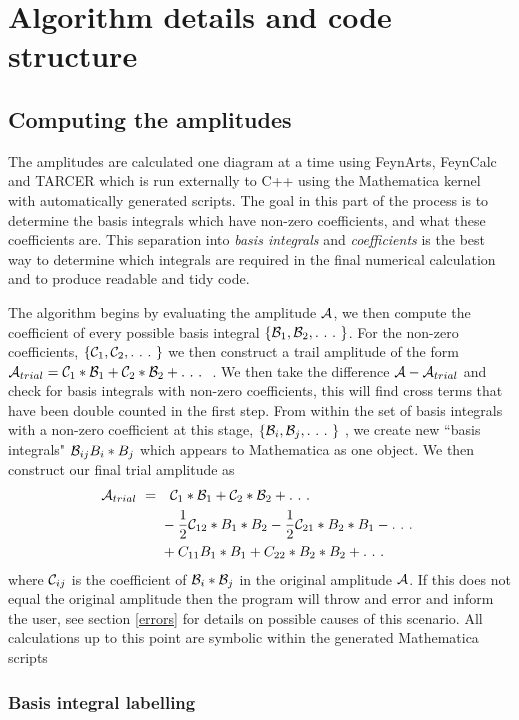 \section{Algorithm details and code structure}


\subsection{Computing the amplitudes}

The amplitudes are calculated one diagram at a time using FeynArts, FeynCalc and TARCER which is run externally to C++ using the Mathematica kernel with automatically generated scripts.  The goal in this part of the process is to determine the basis integrals which have non-zero coefficients, and what these coefficients are.  This separation into \textit{basis integrals} and \textit{coefficients} is the best way to determine which integrals are required in the final numerical calculation and to produce readable and tidy code.

The algorithm begins by evaluating the amplitude $\mathcal{A}$, we then compute the coefficient of every possible basis integral $\{\B_1,\B_2,.\ .\ .\ \}$.  For the non-zero coefficients, $\{\mathcal{C}_1,\mathcal{C}_2, .\ .\ .\  \}$ we then construct a trail amplitude of the form $\mathcal{A}_{trial} = \mathcal{C}_1 * \mathcal{B}_1 + \mathcal{C}_2 * \mathcal{B}_2 + .\ .\ .\ $ .  We then take the difference $\mathcal{A} - \mathcal{A}_{trial}$ and check for basis integrals with non-zero coefficients, this will find cross terms that have been double counted in the first step.  From within the set of basis integrals with a non-zero coefficient at this stage, $\{\mathcal{B}_i,\mathcal{B}_j,.\ .\ .\ \}$ , we create new ``basis integrals" $\mathcal{B}_{ij}  B_i*B_j$ which appears to Mathematica as one object.  We then construct our final trial amplitude as
\begin{align*}
 \A_{trial}\ = \ & \ \ \C_1 * \B_1 + \C_2 * \B_2 + .\ .\ .\ \\ 
  &-\frac{1}{2} \C_{12} * B_1*B_2  -\frac{1}{2} \C_{21} * B_2*B_1 - .\ .\ .\ \\
  & + C_{11} B_1*B_1 + C_{22}*B_2*B_2 + .\ .\ .\ 
\end{align*}
where $ \mathcal{C}_{ij}$ is the coefficient of  $\mathcal{B}_i*\mathcal{B}_j$ in the original amplitude $\mathcal{A}$.  If this does not equal the original amplitude then the program will throw and error and inform the user, see section \ref{errors} for details on possible causes of this scenario.  All calculations up to this point are symbolic within the generated Mathematica scripts

\subsubsection{Basis integral labelling}


